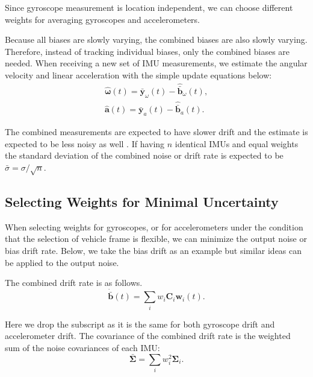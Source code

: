 \documentclass[conference]{IEEEtran}
\begin{document}
Since gyroscope measurement is location independent, we can choose different weights for averaging gyroscopes and accelerometers.

Because all biases are slowly varying, the combined biases are also slowly varying. Therefore, instead of tracking individual biases, only the combined biases are needed. When receiving a new set of IMU measurements, we estimate the angular velocity and linear acceleration with the simple update equations below:
\begin{equation}
\begin{split}
    \hat{\bm{\omega}}(t) = \bar{\textbf{y}}_\omega(t) - \hat{\bar{\textbf{b}}}_\omega(t), \\
    \hat{\textbf{a}}(t)  = \bar{\textbf{y}}_a(t) - \hat{\bar{\textbf{b}}}_a(t).
\end{split}
\end{equation}

The combined measurements are expected to have slower drift and the estimate is expected to be less noisy as well \cite{patel2022_multi-imu}. If having $n$ identical IMUs and equal weights the standard deviation of the combined noise or drift rate is expected to be $\bar{\sigma} = \sigma / \sqrt{n}$.

\subsection{Selecting Weights for Minimal Uncertainty}\label{solve_weight_by_noise}

When selecting weights for gyroscopes, or for accelerometers under the condition that the selection of vehicle frame is flexible, we can minimize the output noise or bias drift rate. Below, we take the bias drift as an example but similar ideas can be applied to the output noise.

The combined drift rate is as follows.
\begin{equation}
    \dot{\bar{\textbf{b}}}(t) = \sum_i{w_i \textbf{C}_i \textbf{w}_i(t)}.
\end{equation}

\noindent Here we drop the subscript as it is the same for both gyroscope drift and accelerometer drift. The covariance of the combined drift rate is the weighted sum of the noise covariances of each IMU:
\begin{equation}
    \bar{\bm{\Sigma}} = \sum_i{w_i^2 \bm{\Sigma}_i}.
\end{equation}
\end{document}
